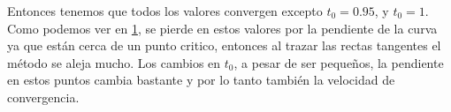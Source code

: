 \begin{figure}[H]
\centering
\label{grafica:1}
\end{figure}

Entonces tenemos que todos los valores convergen excepto $t_{0}=0.95$, y $t_{0}=1$. Como podemos ver en \ref{grafica:1}, 
se pierde en estos valores por la pendiente de la curva ya que están
cerca de un punto critico, entonces al trazar
las rectas tangentes el método se aleja mucho.
Los cambios en $t_{0}$, a pesar de ser pequeños, la pendiente en estos puntos cambia bastante y por lo tanto también la velocidad
de convergencia.
